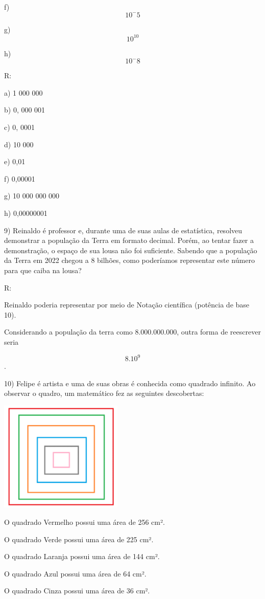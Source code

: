 f) \[10 ^-5\]

g) \[10^10\]

h) \[10^-8\]

R:

a) 1 000 000

b) 0, 000 001

c) 0, 0001

d) 10 000

e) 0,01

f) 0,00001

g) 10 000 000 000

h) 0,00000001

9) Reinaldo é professor e, durante uma de suas aulas de estatística,
resolveu demonstrar a população da Terra em formato decimal. Porém, ao
tentar fazer a demonstração, o espaço de sua lousa não foi suficiente.
Sabendo que a população da Terra em 2022 chegou a 8 bilhões, como
poderíamos representar este número para que caiba na lousa?

R:

Reinaldo poderia representar por meio de Notação científica (potência de
base 10).

Considerando a população da terra como 8.000.000.000, outra forma de
reescrever seria

\[8 . 10^9\].

10) Felipe é artista e uma de suas obras é conhecida como quadrado
infinito. Ao observar o quadro, um matemático fez as seguintes
descobertas:

\includegraphics[width=2.3125in,height=2.07917in]{./imgSAEB_8_MAT/media/image2.png}

O quadrado Vermelho possui uma área de 256 cm².

O quadrado Verde possui uma área de 225 cm².

O quadrado Laranja possui uma área de 144 cm².

O quadrado Azul possui uma área de 64 cm².

O quadrado Cinza possui uma área de 36 cm².

